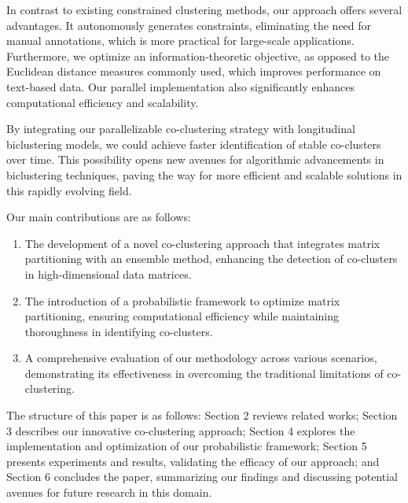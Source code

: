 In contrast to existing constrained clustering methods, our approach offers several advantages. It autonomously generates constraints, eliminating the need for manual annotations, which is more practical for large-scale applications. Furthermore, we optimize an information-theoretic objective, as opposed to the Euclidean distance measures commonly used, which improves performance on text-based data. Our parallel implementation also significantly enhances computational efficiency and scalability.

By integrating our parallelizable co-clustering strategy with longitudinal biclustering models, we could achieve faster identification of stable co-clusters over time. This possibility opens new avenues for algorithmic advancements in biclustering techniques, paving the way for more efficient and scalable solutions in this rapidly evolving field.

Our main contributions are as follows:

\begin{enumerate}
    \item The development of a novel co-clustering approach that integrates matrix partitioning with an ensemble method, enhancing the detection of co-clusters in high-dimensional data matrices.
    \item The introduction of a probabilistic framework to optimize matrix partitioning, ensuring computational efficiency while maintaining thoroughness in identifying co-clusters.
    \item A comprehensive evaluation of our methodology across various scenarios, demonstrating its effectiveness in overcoming the traditional limitations of co-clustering.
\end{enumerate}

The structure of this paper is as follows: Section 2 reviews related works; Section 3 describes our innovative co-clustering approach; Section 4 explores the implementation and optimization of our probabilistic framework; Section 5 presents experiments and results, validating the efficacy of our approach; and Section 6 concludes the paper, summarizing our findings and discussing potential avenues for future research in this domain.